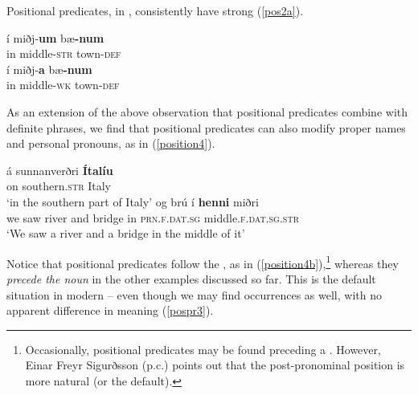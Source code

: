 \documentclass[output=paper,colorlinks,citecolor=brown]{langscibook}
\begin{document}
Positional predicates, in , consistently have strong  (\ref{pos2a}).

\begin{multicols}{2}{
\begin{exe}
  \ex\label{pos2a}
   \begin{xlist}
    \ex \gll í miðj-\textbf{um} bæ\textbf{-num}  \\
        in middle-\textsc{str} town-\textsc{def} \\ 
    \ex \gll *í miðj-\textbf{a} bæ\textbf{-num}  \\
      \phantom{*}in middle-\textsc{wk}  town-\textsc{def} \\    
  \end{xlist}
\end{exe} }
\end{multicols}

As an extension of the above observation that positional predicates combine with definite  phrases, we find that positional predicates can also modify proper names and personal pronouns, as in (\ref{position4}).

\begin{exe}
  \ex \label{position4}
    \begin{xlist}
     \ex \gll á sunnanverðri  \textbf{{Ítalíu}} \\
       on southern.\textsc{str} Italy  \\
       \glt `in the southern part of Italy' 
    \ex  \label{position4b}  {og brú} í \textbf{{henni}} miðri  \\
         {we saw river} {and bridge} in \textsc{prn.f.dat.sg} middle.\textsc{f.dat.sg.str}  \\ 
         \glt  `We saw a river and a bridge in the middle of it' %

   \end{xlist}
\end{exe} 
 


Notice that positional predicates follow the , as in (\ref{position4b}),\footnote{Occasionally, positional predicates may be found preceding a .    
However, Einar Freyr Sigurðsson (p.c.) points out that the post-pronominal position is more natural (or the default).  } whereas they \textit{precede the noun} in the other examples discussed so far. This is the default situation in modern  -- even though we  may find  occurrences as well, with no apparent difference in meaning (\ref{pospr3}).
\end{document}
